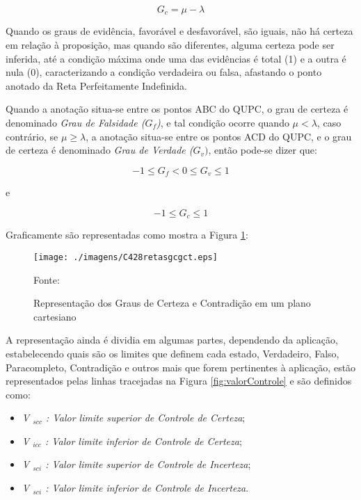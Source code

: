 \begin{center}
\begin{equation}
G _{c} = \mu - \lambda
\label{eq:grauCerteza}
\end{equation}
\end{center}

Quando os graus de evidência, favorável e desfavorável, são iguais, não há certeza em relação à proposição, mas quando são diferentes, alguma certeza pode ser inferida, até a condição máxima onde uma das evidências é total (1) e a outra é nula (0), caracterizando a condição verdadeira ou falsa, afastando o ponto anotado da Reta Perfeitamente Indefinida. 

Quando a anotação situa-se entre os pontos ABC do QUPC, o grau de certeza é denominado \emph{Grau de Falsidade ($G _f$)}, e tal condição ocorre quando $\mu < \lambda $, caso contrário, se $\mu \ge \lambda $, a anotação situa-se entre os pontos ACD do QUPC, e o grau de certeza é denominado \emph{Grau de Verdade ($G _v)$}, então pode-se dizer que:
\begin{center}
\begin{equation}
-1 \le G _{f}  <  0 \le G _{v} \le 1
\label{eq:grauVerdadeFalsidade}
\end{equation}
\end{center}
e
\begin{center}
\begin{equation}
-1 \le G _{c} \le 1
\label{eq:grauCertezaIntervalo}
\end{equation}
\end{center}

Graficamente são representadas como mostra a Figura \ref{fig:retasgcgct}:

\begin{figure}[!htb]
\caption{Representação dos Graus de Certeza e Contradição em um plano cartesiano}
\center\texttt{[image: ./imagens/C428retasgcgct.eps]}
\label{fig:retasgcgct}

{\small Fonte: \cite{JoaoInacio}}
\end{figure}

A representação ainda é dividia em algumas partes, dependendo da aplicação, estabelecendo quais são os limites que definem cada estado, Verdadeiro, Falso, Paracompleto, Contradição e outros mais que forem pertinentes à aplicação, estão representados pelas linhas tracejadas na Figura \ref{fig:valorControle} e são definidos como:

\begin{itemize}
\item \emph{V $_{scc}$ : Valor limite superior de Controle de Certeza};
\item \emph{V $_{icc}$ : Valor limite inferior de Controle de Certeza};
\item \emph{V $_{sci}$ : Valor limite superior de Controle de Incerteza};
\item \emph{V $_{sci}$ : Valor limite inferior de Controle de Incerteza}.

\end{itemize}

